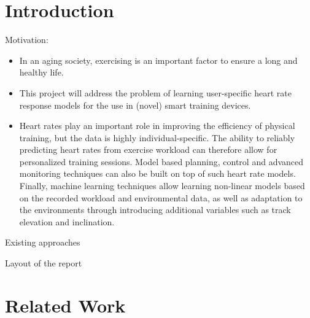 \section{Introduction}

Motivation:
\begin{itemize}
    \item In an aging society, exercising is an important factor to ensure a long and healthy life.
    \item This project will address the problem of learning user-specific heart rate response models for the use in (novel) smart training devices.
    \item Heart rates play an important role in improving the efficiency of physical training, but the data is highly individual-specific. The ability to reliably predicting heart rates from exercise workload can therefore allow for personalized training sessions. Model based planning, control and advanced monitoring techniques can also be built on top of such heart rate models. Finally, machine learning techniques allow learning non-linear models based on the recorded workload and environmental data, as well as adaptation to the environments through introducing additional variables such as track elevation and inclination.
\end{itemize}

Existing approaches

Layout of the report

\section{Related Work}
